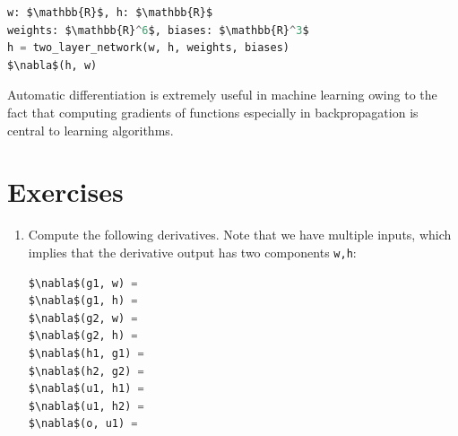 \documentclass[book.tex]{subfiles}
\begin{document}
\begin{lstlisting}[language=python]
w: $\mathbb{R}$, h: $\mathbb{R}$
weights: $\mathbb{R}^6$, biases: $\mathbb{R}^3$
h = two_layer_network(w, h, weights, biases)
$\nabla$(h, w)
\end{lstlisting}

Automatic differentiation is extremely useful in machine learning owing to the fact that computing gradients of functions especially in backpropagation is central to learning algorithms. %

\section{Exercises}
\begin{enumerate}
    \item Compute the following derivatives. Note that we have multiple inputs, which implies that the derivative output has two components \lstinline{w,h}:

\begin{lstlisting}[language=python]
$\nabla$(g1, w) =                    
$\nabla$(g1, h) =
$\nabla$(g2, w) =                    
$\nabla$(g2, h) =
$\nabla$(h1, g1) =
$\nabla$(h2, g2) =
$\nabla$(u1, h1) =              
$\nabla$(u1, h2) =
$\nabla$(o, u1) =
\end{lstlisting}
\end{enumerate}
\end{document}
